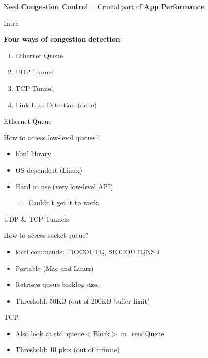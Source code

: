 

\begin{frame}{Need}
\textbf{Congestion Control} = Crucial part of \textbf{App Performance}
\end{frame}


\begin{frame}{Intro}

\textbf{Four ways of congestion detection:}
\begin{enumerate}
\item Ethernet Queue
\item UDP Tunnel
\item TCP Tunnel
\item Link Loss Detection (done)
\end{enumerate}


\end{frame}



\begin{frame}{Ethernet Queue}

How to access low-level queues?
\begin{itemize}
\item libnl library
\item OS-dependent (Linux)
\item Hard to use (very low-level API)
\item[$\Rightarrow$] Couldn't get it to work.
\end{itemize}

\end{frame}


\begin{frame}{UDP \& TCP Tunnels}

How to access socket queue? 
\begin{itemize}
\item ioctl commands: TIOCOUTQ, SIOCOUTQNSD
\item Portable (Mac and Linux)
\item Retrieve queue backlog size.
\item Threshold: 50KB (out of 200KB buffer limit)
\end{itemize}

\pause
TCP: 
\begin{itemize}
\item Also look at std::queue$<$Block$>$ m\_sendQueue
\item Threshold: 10 pkts (out of infinite)
\end{itemize}

\end{frame}



